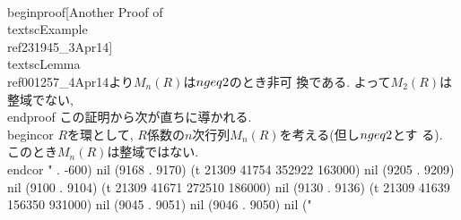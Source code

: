  \\begin{proof}[Another Proof of \\textsc{Example}~\\ref{231945_3Apr14}]
  \\textsc{Lemma}~\\ref{001257_4Apr14}より$M_{n}(R)$は$n\\geq 2$のとき非可
  換である. よって$M_{2}(R)$は整域でない, 
 \\end{proof}
 この証明から次が直ちに導かれる.
 \\begin{cor}
  $R$を環として, $R$係数の$n$次行列$M_{n}(R)$を考える(但し$n\\geq2$とす
  る). このとき$M_{n}(R)$は整域ではない.
 \\end{cor}
" . -600) nil (9168 . 9170) (t 21309 41754 352922 163000) nil (9205 . 9209) nil (9100 . 9104) (t 21309 41671 272510 186000) nil (9130 . 9136) (t 21309 41639 156350 931000) nil (9045 . 9051) nil (9046 . 9050) nil ("%